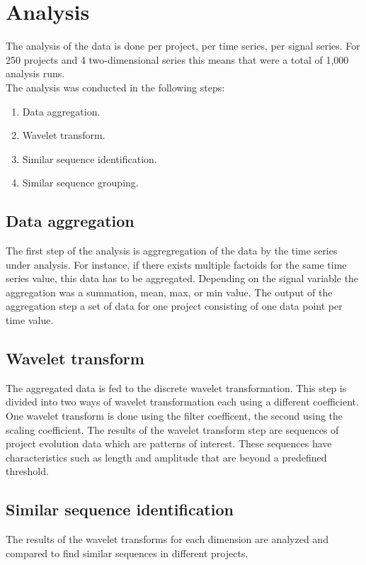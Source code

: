 \section{Analysis}
The analysis of the data is done per project, per time series, per signal
series. For 250 projects and 4 two-dimensional series this means that were a
total of 1,000 analysis runs.\\
The analysis was conducted in the following steps:
\begin{enumerate}
	\item Data aggregation.
	\item Wavelet transform.
	\item Similar sequence identification.
	\item Similar sequence grouping.
\end{enumerate}

\subsection{Data aggregation}
The first step of the analysis is aggregregation of the data by the time series
under analysis. For instance, if there exists multiple factoids for the same
time series value, this data has to be aggregated. Depending on the signal
variable the aggregation was a summation, mean, max, or min value. The output of
the aggregation step a set of data for one project consisting of one data point
per time value.

\subsection{Wavelet transform}
The aggregated data is fed to the discrete wavelet transformation. This step is
divided into two ways of wavelet transformation each using a different
coefficient. One wavelet transform is done using the filter coefficent, the
second using the scaling coefficient. The results of the wavelet transform step
are sequences of project evolution data which are patterns of interest. These
sequences have characteristics such as length and amplitude that are beyond a
predefined threshold.

\subsection{Similar sequence identification}
The results of the wavelet transforms for each dimension are analyzed and
compared to find similar sequences in different projects.

